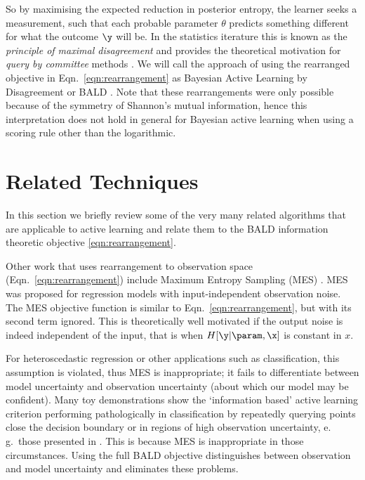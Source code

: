 So by maximising the expected reduction in posterior entropy, the learner seeks a measurement, such that each probable parameter $\theta$ predicts something different for what the outcome $\y$ will be. In the statistics iterature  this is known as the \emph{principle of maximal disagreement} and provides the theoretical motivation for \emph{query by committee} methods \citep{seung1997}. We will call the approach of using the rearranged objective in Eqn.\ \eqref{eqn:rearrangement} as Bayesian Active Learning by Disagreement or BALD \citep{Houlsby2011,Houlsby2012preference,Huszar2012quantum}. Note that these rearrangements were only possible because of the symmetry of Shannon's mutual information, hence this interpretation does not hold in general for Bayesian active learning when using a scoring rule other than the logarithmic.

\section{Related Techniques}

In this section we briefly review some of the very many related algorithms that are applicable to active learning and relate them to the BALD information theoretic objective \eqref{eqn:rearrangement}.

Other work that uses rearrangement to observation space (Eqn.\ \eqref{eqn:rearrangement}) include Maximum Entropy Sampling (MES) \citep{sebastiani2000}. MES was proposed for regression models with input-independent observation noise. The MES objective function is similar to Eqn.\ \eqref{eqn:rearrangement}, but with its second term ignored. This is theoretically well motivated if the output noise is indeed independent of the input, that is when $H[\y\vert\param,\x]$ is constant in $x$.

For heteroscedastic regression or other applications such as classification, this assumption is violated, thus MES is inappropriate; it fails to differentiate between model uncertainty and observation uncertainty (about which our model may be confident). Many toy demonstrations show the `information based' active learning criterion performing pathologically in classification by repeatedly querying points close the decision boundary or in regions of high observation uncertainty, e.\,g.\ those presented in \citep{dasgupta2008, huang2010}. This is because MES is inappropriate in those circumstances. Using the full BALD objective distinguishes between observation and model uncertainty and eliminates these problems.


